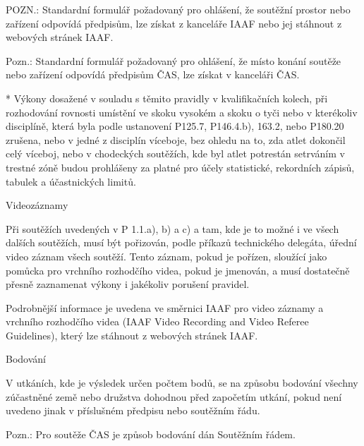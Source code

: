   POZN.: Standardní formulář požadovaný pro ohlášení, že soutěžní prostor nebo zařízení odpovídá předpisům, lze získat z  kanceláře IAAF nebo jej stáhnout z webových stránek IAAF.

  Pozn.: Standardní formulář požadovaný pro ohlášení, že místo konání soutěže nebo zařízení odpovídá předpisům ČAS, lze získat v kanceláři ČAS.
  \enditems

* Výkony dosažené v souladu s těmito pravidly v kvalifikačních kolech, při rozhodování rovnosti umístění ve skoku vysokém a skoku o tyči nebo v kterékoliv disciplíně, která byla podle ustanovení P125.7, P146.4.b), 163.2, nebo P180.20 zrušena, nebo v jedné z disciplín víceboje, bez ohledu na to, zda atlet dokončil celý víceboj, nebo v chodeckých soutěžích, kde byl atlet potrestán setrváním v trestné zóně budou prohlášeny za platné pro účely statistické, rekordních zápisů, tabulek a účastnických limitů.
\enditems

\secc Videozáznamy

Při soutěžích uvedených v P 1.1.a), b) a c) a tam, kde je to možné i ve všech dalších soutěžích, musí být pořizován, podle příkazů technického delegáta, úřední video záznam všech soutěží. Tento záznam, pokud je pořízen, sloužící jako pomůcka pro vrchního rozhodčího videa, pokud je jmenován, a musí dostatečně přesně zaznamenat výkony i jakékoliv porušení pravidel.

Podrobnější informace je uvedena ve směrnici IAAF pro video záznamy a vrchního rozhodčího videa (IAAF Video Recording and Video Referee Guidelines), který lze stáhnout z webových stránek IAAF.

\secc Bodování

V utkáních, kde je výsledek určen počtem bodů, se na způsobu bodování všechny zúčastněné země nebo družstva dohodnou před započetím utkání, pokud není uvedeno jinak v příslušném předpisu nebo soutěžním řádu.

Pozn.: Pro soutěže ČAS je způsob bodování dán Soutěžním řádem.

\endinput